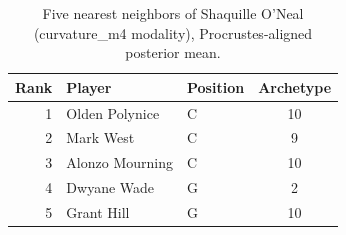 \begin{table}[htbp]
  \centering\small
  \begin{tabular}{rllc}
    \toprule
    Rank & Player & Position & Archetype \\
    \midrule
    1 & Olden Polynice & C & 10 \\
    2 & Mark West & C & 9 \\
    3 & Alonzo Mourning & C & 10 \\
    4 & Dwyane Wade & G & 2 \\
    5 & Grant Hill & G & 10 \\
    \bottomrule
  \end{tabular}
  \caption{Five nearest neighbors of Shaquille O'Neal (curvature_m4 modality), Procrustes-aligned posterior mean.}
  \label{tab:Shaquille_O_Neal_neighbors_curvature_m4}
\end{table}

